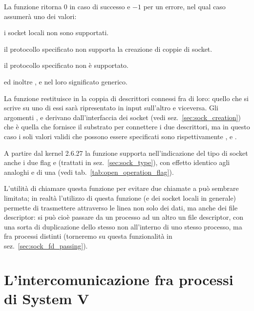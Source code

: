 \begin{funcproto}{
}

{La funzione ritorna $0$ in caso di successo e $-1$ per un errore, nel qual
  caso  assumerà uno dei valori: 
  \begin{errlist}
  \item[\errcode{EAFNOSUPPORT}] i socket locali non sono supportati.
  \item[\errcode{EOPNOTSUPP}] il protocollo specificato non supporta la
  creazione di coppie di socket.
  \item[\errcode{EPROTONOSUPPORT}] il protocollo specificato non è supportato.
  \end{errlist}
  ed inoltre ,  e  nel loro
  significato generico.}
\end{funcproto}

La funzione restituisce in  la coppia di descrittori connessi fra di
loro: quello che si scrive su uno di essi sarà ripresentato in input
sull'altro e viceversa. Gli argomenti ,  e
 derivano dall'interfaccia dei socket (vedi
sez.~\ref{sec:sock_creation}) che è quella che fornisce il substrato per
connettere i due descrittori, ma in questo caso i soli valori validi che
possono essere specificati sono rispettivamente ,
 e .  

A partire dal kernel 2.6.27 la funzione supporta nell'indicazione del tipo di
socket anche i due flag  e 
(trattati in sez.~\ref{sec:sock_type}), con effetto identico agli analoghi
 e  di una  (vedi
tab.~\ref{tab:open_operation_flag}).

L'utilità di chiamare questa funzione per evitare due chiamate a 
può sembrare limitata; in realtà l'utilizzo di questa funzione (e dei socket
locali in generale) permette di trasmettere attraverso le linea non solo dei
dati, ma anche dei file descriptor: si può cioè passare da un processo ad un
altro un file descriptor, con una sorta di duplicazione dello stesso non
all'interno di uno stesso processo, ma fra processi distinti (torneremo su
questa funzionalità in sez.~\ref{sec:sock_fd_passing}).


\section{L'intercomunicazione fra processi di System V}
\label{sec:ipc_sysv}

